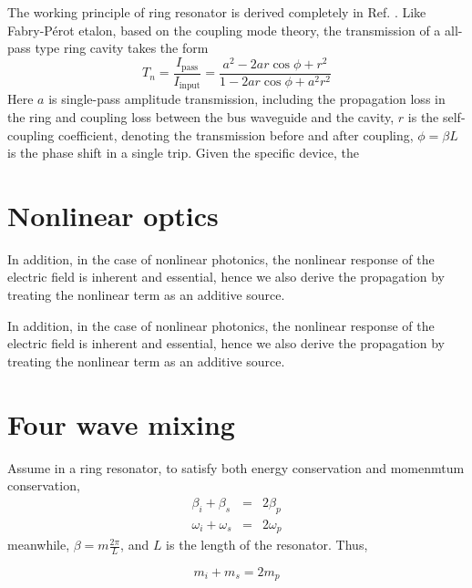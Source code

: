 \documentclass[final]{kuee_en}
\newcommand{\tmname}[1]{\textsc{#1}}
\begin{document}
The working principle of ring resonator is derived completely in Ref. \cite{Bogaerts2012}. Like Fabry-P\'{e}rot etalon,  based on the coupling mode theory, the transmission of a all-pass type ring cavity takes the form
\begin{equation}
    T_n = \frac{I_\mathrm{pass}}{I_\mathrm{input}} = \frac{a^2 - 2ar \cos \phi + r^2}{1 - 2ar \cos \phi + a^2 r^2}
\end{equation}
Here $a$ is single-pass amplitude transmission, including the propagation loss in the ring and coupling loss between the bus waveguide and the cavity, $r$ is the self-coupling coefficient, denoting the transmission before and after coupling, $\phi=\beta L$ is the phase shift in a single trip. Given the specific device, the 

\section{Nonlinear optics}

In addition, in the case of nonlinear photonics, the nonlinear response of the
electric field is inherent and essential, hence we also derive the propagation
by treating the nonlinear term as an additive source.



In addition, in the case of nonlinear photonics, the nonlinear response of the
electric field is inherent and essential, hence we also derive the propagation
by treating the nonlinear term as an additive source.

\section{Four wave mixing}


Assume in a ring resonator, to satisfy both energy conservation and momenmtum
conservation,
\begin{eqnarray*}
  \beta_i + \beta_s & = & 2 \beta_p\\
  \omega_i + \omega_s & = & 2 \omega_p
\end{eqnarray*}
meanwhile, $\beta = m \frac{2 \pi}{L}$, and $L$ is the length of the
resonator. Thus,

{\tmname{\begin{equation}
  m_i + m_s = 2 m_p
\end{equation}}}
\end{document}
